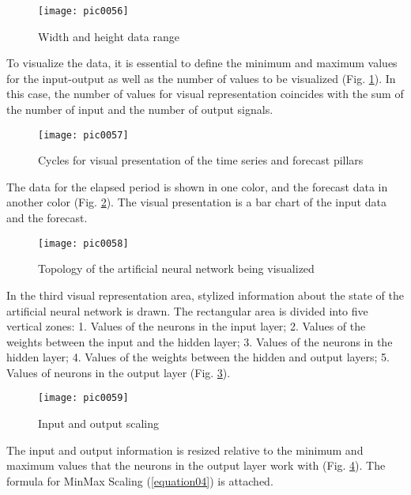\begin{figure}[h]
\centering
\texttt{[image: pic0056]}
\caption{Width and height data range}
\label{fig:pic0056}
\end{figure}
\FloatBarrier

To visualize the data, it is essential to define the minimum and maximum values for the input-output as well as the number of values to be visualized (Fig. \ref{fig:pic0056}). In this case, the number of values for visual representation coincides with the sum of the number of input and the number of output signals.

\begin{figure}[h]
\centering
\texttt{[image: pic0057]}
\caption{Cycles for visual presentation of the time series and forecast pillars}
\label{fig:pic0057}
\end{figure}
\FloatBarrier

The data for the elapsed period is shown in one color, and the forecast data in another color (Fig. \ref{fig:pic0057}). The visual presentation is a bar chart of the input data and the forecast.

\begin{figure}[h]
\centering
\texttt{[image: pic0058]}
\caption{Topology of the artificial neural network being visualized}
\label{fig:pic0058}
\end{figure}
\FloatBarrier

In the third visual representation area, stylized information about the state of the artificial neural network is drawn. The rectangular area is divided into five vertical zones: 1. Values of the neurons in the input layer; 2. Values of the weights between the input and the hidden layer; 3. Values of the neurons in the hidden layer; 4. Values of the weights between the hidden and output layers; 5. Values of neurons in the output layer (Fig. \ref{fig:pic0058}).

\begin{figure}[h]
\centering
\texttt{[image: pic0059]}
\caption{Input and output scaling}
\label{fig:pic0059}
\end{figure}
\FloatBarrier

The input and output information is resized relative to the minimum and maximum values that the neurons in the output layer work with (Fig. \ref{fig:pic0059}). The formula for MinMax Scaling (\ref{equation04}) is attached.


